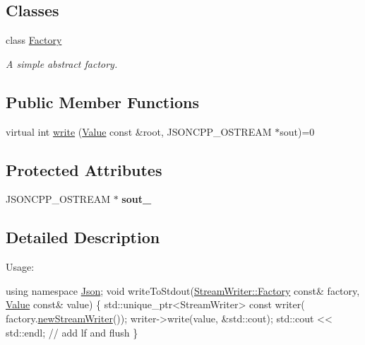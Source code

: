 \subsection*{Classes}
\begin{DoxyCompactItemize}
\item 
class \hyperlink{classJson_1_1StreamWriter_1_1Factory}{Factory}
\begin{DoxyCompactList}\small\item\em A simple abstract factory. \end{DoxyCompactList}\end{DoxyCompactItemize}
\subsection*{Public Member Functions}
\begin{DoxyCompactItemize}
\item 
virtual int \hyperlink{classJson_1_1StreamWriter_a84278bad0c9a9fc587bc2a97c5bb5993}{write} (\hyperlink{classJson_1_1Value}{Value} const \&root, J\+S\+O\+N\+C\+P\+P\+\_\+\+O\+S\+T\+R\+E\+AM $\ast$sout)=0
\end{DoxyCompactItemize}
\subsection*{Protected Attributes}
\begin{DoxyCompactItemize}
\item 
J\+S\+O\+N\+C\+P\+P\+\_\+\+O\+S\+T\+R\+E\+AM $\ast$ {\bfseries sout\+\_\+}\hypertarget{classJson_1_1StreamWriter_a4f5603d4228a9fa46a42cb44e5234d9b}{}\label{classJson_1_1StreamWriter_a4f5603d4228a9fa46a42cb44e5234d9b}

\end{DoxyCompactItemize}


\subsection{Detailed Description}
Usage\+: 
\begin{DoxyCode}
\textcolor{keyword}{using namespace }\hyperlink{namespaceJson}{Json};
\textcolor{keywordtype}{void} writeToStdout(\hyperlink{classJson_1_1StreamWriter_1_1Factory}{StreamWriter::Factory} \textcolor{keyword}{const}& factory, 
      \hyperlink{classJson_1_1Value}{Value} \textcolor{keyword}{const}& value) \{
  std::unique\_ptr<StreamWriter> \textcolor{keyword}{const} writer(
    factory.\hyperlink{classJson_1_1StreamWriter_1_1Factory_a9d30ec53e8288cd53befccf1009c5f31}{newStreamWriter}());
  writer->write(value, &std::cout);
  std::cout << std::endl;  \textcolor{comment}{// add lf and flush}
\}
\end{DoxyCode}
 

